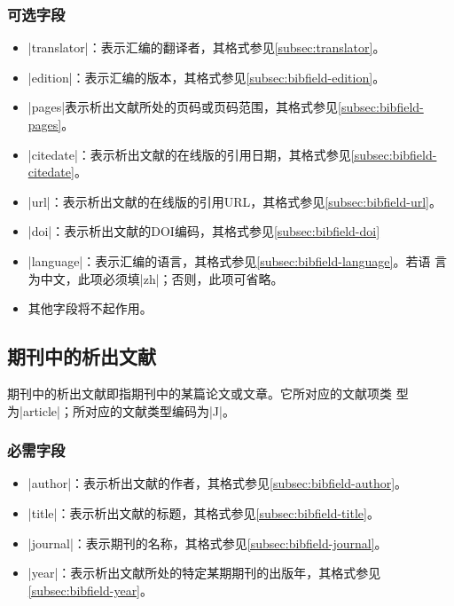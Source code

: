 \subsubsection{可选字段}

\begin{itemize}
\item |translator|：表示汇编的翻译者，其格式参见\ref{subsec:translator}。
\item |edition|：表示汇编的版本，其格式参见\ref{subsec:bibfield-edition}。
\item |pages|表示析出文献所处的页码或页码范围，其格式参见\ref{subsec:bibfield-pages}。
\item |citedate|：表示析出文献的在线版的引用日期，其格式参见\ref{subsec:bibfield-citedate}。
\item |url|：表示析出文献的在线版的引用URL，其格式参见\ref{subsec:bibfield-url}。
\item |doi|：表示析出文献的DOI编码，其格式参见\ref{subsec:bibfield-doi}
\item |language|：表示汇编的语言，其格式参见\ref{subsec:bibfield-language}。若语
  言为中文，此项必须填|zh|；否则，此项可省略。
\item 其他字段将不起作用。
\end{itemize}


\subsection{期刊中的析出文献}\label{subsec:bibtype-article}

期刊中的析出文献即指期刊中的某篇论文或文章\cite{gbt7714-2005}。它所对应的{\BibTeX}文献项类
型为|article|；所对应的文献类型编码为|J|\cite{gbt3469-1983}。

\subsubsection{必需字段}

\begin{itemize}
\item |author|：表示析出文献的作者，其格式参见\ref{subsec:bibfield-author}。
\item |title|：表示析出文献的标题，其格式参见\ref{subsec:bibfield-title}。
\item |journal|：表示期刊的名称，其格式参见\ref{subsec:bibfield-journal}。
\item |year|：表示析出文献所处的特定某期期刊的出版年，其格式参见\ref{subsec:bibfield-year}。
\end{itemize}

